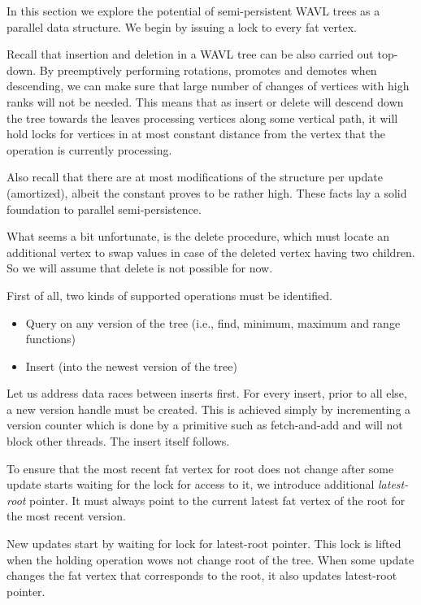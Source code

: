 In this section we explore the potential of semi-persistent WAVL trees as a parallel data structure. 
We begin by issuing a lock to every fat vertex.

Recall that insertion and deletion in a WAVL tree can be also carried out top-down.
By preemptively performing rotations, promotes and demotes when descending, we can make sure that large number of changes of vertices with high ranks will not be needed. This means that as insert or delete will descend down the tree towards the leaves processing vertices along some vertical path, it will hold locks for vertices in at most constant distance from the vertex that the operation is currently processing.

Also recall that there are at most  modifications of the structure per update (amortized), albeit the constant proves to be rather high. These facts lay a solid foundation to parallel semi-persistence.

What seems a bit unfortunate, is the delete procedure, which must locate an additional vertex to swap values in case of the deleted vertex having two children. So we will assume that delete is not possible for now.

First of all, two kinds of supported operations must be identified. 

\begin{itemize}
	\item Query on any version of the tree (i.e., find, minimum, maximum and range functions)
	\item Insert (into the newest version of the tree)
\end{itemize}

Let us address data races between inserts first. For every insert, prior to all else, a new version handle must be created. This is achieved simply by incrementing a version counter which is done by a primitive such as fetch-and-add and will not block other threads. The insert itself follows.

To ensure that the most recent fat vertex for root does not change after some update starts waiting for the lock for access to it, we introduce additional \emph{latest-root} pointer. It must always point to the current latest fat vertex of the root for the most recent version. 

New updates start by waiting for lock for latest-root pointer. This lock is lifted when the holding operation wows not change root of the tree. When some update changes the fat vertex that corresponds to the root, it also updates latest-root pointer.

